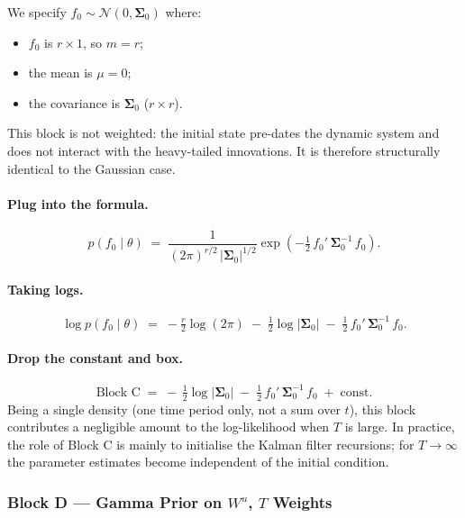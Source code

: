 \documentclass[11pt, a4paper, oneside]{article}
\begin{document}
We specify $f_0 \sim \mathcal{N}(0, \boldsymbol{\Sigma}_0)$ where:
\begin{itemize}[leftmargin=1.5em, itemsep=2pt]
    \item $f_0$ is $r \times 1$, so $m = r$;
    \item the mean is $\mu = 0$;
    \item the covariance is $\boldsymbol{\Sigma}_0$ ($r \times r$).
\end{itemize}
This block is not weighted: the initial state pre-dates the dynamic
system and does not interact with the heavy-tailed innovations. It is
therefore structurally identical to the Gaussian case.

\paragraph{Plug into the formula.}
\[
p(f_0 \mid \theta) \;=\; \frac{1}{(2\pi)^{r/2}\, |\boldsymbol{\Sigma}_0|^{1/2}}
\exp\!\left(-\tfrac{1}{2}\, f_0'\,\boldsymbol{\Sigma}_0^{-1}\, f_0\right).
\]

\paragraph{Taking logs.}
\[
\log p(f_0 \mid \theta)
\;=\; -\tfrac{r}{2}\log(2\pi) \;-\; \tfrac{1}{2}\log|\boldsymbol{\Sigma}_0|
\;-\; \tfrac{1}{2}\, f_0'\,\boldsymbol{\Sigma}_0^{-1}\, f_0.
\]

\paragraph{Drop the constant and box.}
\begin{equation}
\boxed{\,
\text{Block C} \;=\;
-\,\tfrac{1}{2}\log|\boldsymbol{\Sigma}_0|
\;-\; \tfrac{1}{2}\,f_0'\,\boldsymbol{\Sigma}_0^{-1}\,f_0 \;+\; \text{const}.
\,}
\label{eq:block-C}
\end{equation}
Being a single density (one time period only, not a sum over $t$), this
block contributes a negligible amount to the log-likelihood when $T$ is
large. In practice, the role of Block C is mainly to initialise the
Kalman filter recursions; for $T \to \infty$ the parameter estimates
become independent of the initial condition.

\subsubsection*{Block D — Gamma Prior on $W^u$, $T$ Weights}
\end{document}
